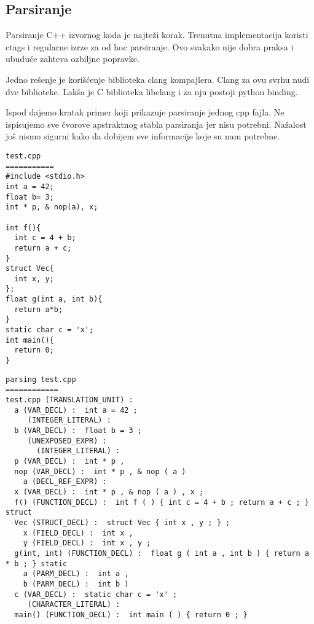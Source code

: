 \documentclass[a4paper]{article}
\begin{document}
{\subsection{Parsiranje}
\label{sec:pars}

Parsiranje C++ izvornog koda je najteži korak.
Trenutna implementacija koristi ctags i regularne izrze za od hoc parsiranje.
Ovo svakako nije dobra praksa i ubuduće zahteva ozbiljne popravke.

Jedno rešenje je korišćenje biblioteka clang kompajlera.
Clang za ovu svrhu nudi dve biblioteke. Lakša je C biblioteka libclang i za nju
postoji python binding. \cite{Clang}

Ispod dajemo kratak primer koji prikazuje parsiranje jednog cpp fajla.
Ne ispisujemo sve čvorove apstraktnog stabla parsiranja jer nisu potrebni.
Nažalost još nismo sigurni kako da dobijem sve informacije koje su nam potrebne.

\noindent\begin{minipage}[t]{.45\textwidth} \begin{verbatim}
test.cpp
===========
#include <stdio.h>
int a = 42;
float b= 3;
int * p, & nop(a), x;

int f(){
  int c = 4 + b;
  return a + c;
}
struct Vec{
  int x, y;
};
float g(int a, int b){
  return a*b;
}
static char c = 'x';
int main(){
  return 0;
}
        \end{verbatim} \end{minipage}\hfill
        \begin{minipage}[t]{.45\textwidth} \begin{verbatim}
parsing test.cpp
============
test.cpp (TRANSLATION_UNIT) :  
  a (VAR_DECL) :  int a = 42 ;
     (INTEGER_LITERAL) :  
  b (VAR_DECL) :  float b = 3 ;
     (UNEXPOSED_EXPR) :  
       (INTEGER_LITERAL) :  
  p (VAR_DECL) :  int * p ,
  nop (VAR_DECL) :  int * p , & nop ( a )
    a (DECL_REF_EXPR) :  
  x (VAR_DECL) :  int * p , & nop ( a ) , x ;
  f() (FUNCTION_DECL) :  int f ( ) { int c = 4 + b ; return a + c ; } struct
  Vec (STRUCT_DECL) :  struct Vec { int x , y ; } ;
    x (FIELD_DECL) :  int x ,
    y (FIELD_DECL) :  int x , y ;
  g(int, int) (FUNCTION_DECL) :  float g ( int a , int b ) { return a * b ; } static
    a (PARM_DECL) :  int a ,
    b (PARM_DECL) :  int b )
  c (VAR_DECL) :  static char c = 'x' ;
     (CHARACTER_LITERAL) :  
  main() (FUNCTION_DECL) :  int main ( ) { return 0 ; }
        \end{verbatim} \end{minipage}

}
\end{document}
